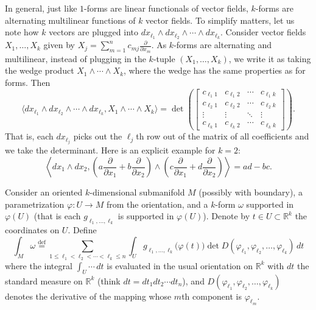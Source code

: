 \documentclass[12pt,openany]{book}
\newcommand{\R}{{\mathbb{R}}}
\theoremstyle{plain}
\theoremstyle{remark}
\theoremstyle{definition}
\theoremstyle{exercise}
\theoremstyle{example}
\begin{document}
In general, just like $1$-forms are linear functionals of vector fields,
$k$-forms are alternating multilinear functions of $k$ vector fields.
To simplify matters, let us note how
$k$ vectors are plugged into
$dx_{\ell_1} \wedge dx_{\ell_2} \wedge \cdots \wedge dx_{\ell_k}$.
Consider vector fields $X_1,\ldots,X_k$ given by
$X_j = \sum_{m=1}^n c_{m j} \frac{\partial}{\partial x_m}$.
As $k$-forms are alternating and multilinear, instead of plugging in
the $k$-tuple $(X_1,\ldots,X_k)$, we write it as taking the
wedge product $X_1 \wedge \cdots \wedge X_k$, where the wedge has the
same properties as for forms.
Then
\begin{equation*}
\bigl\langle
dx_{\ell_1} \wedge
dx_{\ell_2} \wedge
\cdots \wedge
dx_{\ell_k}
,
X_1 \wedge \cdots \wedge X_k
\rangle
=
\det
\left(
\begin{bmatrix}
c_{\ell_1 1} & c_{\ell_1 2} & \cdots & c_{\ell_1 k} \\
c_{\ell_2 1} & c_{\ell_2 2} & \cdots & c_{\ell_2 k} \\
\vdots & \vdots & \ddots & \vdots \\
c_{\ell_k 1} & c_{\ell_k 2} & \cdots & c_{\ell_k k}
\end{bmatrix}
\right) .
\end{equation*}
That is, each $dx_{\ell_j}$ picks out the $\ell_j$th row out of the matrix
of all coefficients and we take the determinant.  Here is an explicit
example for $k=2$:
\begin{equation*}
\left\langle
dx_1 \wedge dx_2
,
\left(
a \frac{\partial}{\partial x_1} +
b \frac{\partial}{\partial x_2}
\right)
\wedge
\left(
c \frac{\partial}{\partial x_1} +
d \frac{\partial}{\partial x_2}
\right)
\right\rangle
=
ad-bc .
\end{equation*}

Consider
an oriented $k$-dimensional submanifold $M$
(possibly with boundary), a parametrization $\varphi \colon U \to M$
from the orientation,
and a $k$-form $\omega$
supported in $\varphi(U)$ (that is each $g_{\ell_1,\ldots,\ell_k}$ is supported in
$\varphi(U)$).
Denote by $t \in U \subset \R^k$
the coordinates on $U$.  Define
\begin{equation*}
\int_M \omega
\overset{\text{def}}{=}
\sum_{1 \leq \ell_1 < \ell_2 < \cdots < \ell_k \leq n}
\int_U
g_{\ell_1,\ldots,\ell_k}\bigl(\varphi(t)\bigr)
\det D (\varphi_{\ell_1},\varphi_{\ell_2},\ldots,\varphi_{\ell_k})
\,
dt
\end{equation*}
where the integral $\int_U \cdots\, dt$ is evaluated in the
usual orientation on $\R^k$ with $dt$ the standard
measure on $\R^k$ (think $dt = dt_1 dt_2 \cdots dt_n$), and
$D (\varphi_{\ell_1},\varphi_{\ell_2},\ldots,\varphi_{\ell_k})$
denotes the derivative of the mapping whose $m$th component
is $\varphi_{\ell_m}$.
\end{document}
